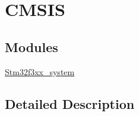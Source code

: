 \hypertarget{group___c_m_s_i_s}{}\section{C\+M\+S\+I\+S}
\label{group___c_m_s_i_s}
\subsection*{Modules}
\begin{DoxyCompactItemize}
\item 
\hyperlink{group__stm32f3xx__system}{Stm32f3xx\+\_\+system}
\end{DoxyCompactItemize}


\subsection{Detailed Description}
